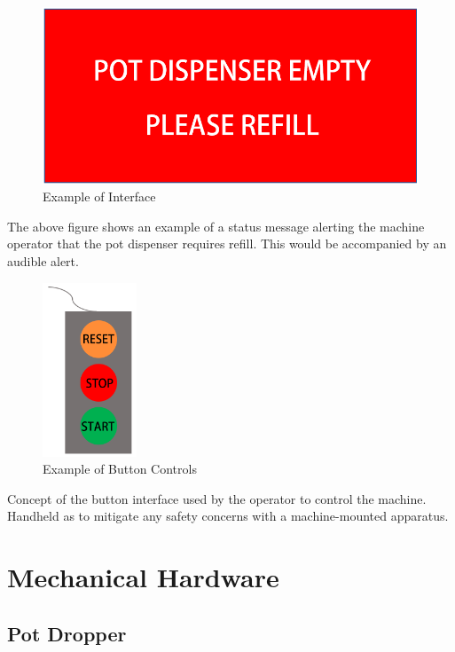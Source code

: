 \documentclass[12pt, titlepage]{article}
\begin{document}
\begin{figure}[H]
  \centering
\includegraphics{interface1.png}
\caption{Example of Interface}
  \label{fig:interface1}
\end{figure}
The above figure shows an example of a status message alerting the machine operator that the pot 
dispenser requires refill. This would be accompanied by an audible alert.

\begin{figure}[H]
  \centering
\includegraphics[width=0.25\textwidth]{interface2.png}
\caption{Example of Button Controls}
  \label{fig:interface2}
\end{figure}
Concept of the button interface used by the operator to control the machine. 
Handheld as to mitigate any safety concerns with a machine-mounted apparatus.

\section{Mechanical Hardware}

\subsection{Pot Dropper}
\end{document}

